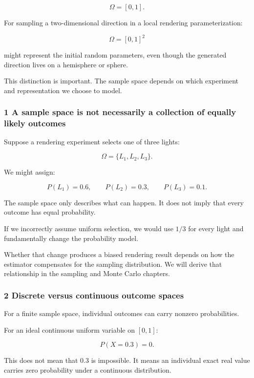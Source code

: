 \[
 \Omega=[0,1].
\]

For sampling a two-dimensional direction in a local rendering parameterization:

\[
 \Omega=[0,1]^2
\]

might represent the initial random parameters, even though the generated direction lives on a hemisphere or sphere.

This distinction is important. The sample space depends on which experiment and representation we choose to model.

\subsubsection{1 A sample space is not necessarily a collection of equally likely outcomes}\label{02-foundations-ii-ch023-a-sample-space-is-not-necessarily-a-collection-of-equally-likely-outcomes}

Suppose a rendering experiment selects one of three lights:

\[
 \Omega=\{L_1,L_2,L_3\}.
\]

We might assign:

\[
 P(L_1)=0.6,\qquad P(L_2)=0.3,\qquad P(L_3)=0.1.
\]

The sample space only describes what can happen. It does not imply that every outcome has equal probability.

If we incorrectly assume uniform selection, we would use \(1/3\) for every light and fundamentally change the probability model.

Whether that change produces a biased rendering result depends on how the estimator compensates for the sampling distribution. We will derive that relationship in the sampling and Monte Carlo chapters.

\subsubsection{2 Discrete versus continuous outcome spaces}\label{02-foundations-ii-ch023-discrete-versus-continuous-outcome-spaces}

For a finite sample space, individual outcomes can carry nonzero probabilities.

For an ideal continuous uniform variable on \([0,1]\):

\[
 P(X=0.3)=0.
\]

This does not mean that \(0.3\) is impossible. It means an individual exact real value carries zero probability under a continuous distribution.

